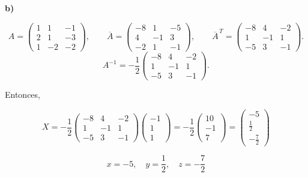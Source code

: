 \documentclass[a4paper,12pt]{article}
\begin{document}
\begin{ejercicio}[title=Ejercicio 25]
\textbf{b)}

\[
A =
\begin{pmatrix}
1 & 1 & -1\\
2 & 1 & -3\\
1 & -2 & -2
\end{pmatrix},
\qquad
\overline{A} =
\begin{pmatrix}
-8 & 1 & -5\\
4 & -1 & 3\\
-2 & 1 & -1
\end{pmatrix},
\qquad
\overline{A}^{\,T} =
\begin{pmatrix}
-8 & 4 & -2\\
1 & -1 & 1\\
-5 & 3 & -1
\end{pmatrix}.
\]
\[
A^{-1}
= -\frac{1}{2}
\begin{pmatrix}
-8 & 4 & -2\\
1 & -1 & 1\\
-5 & 3 & -1
\end{pmatrix}.
\]

Entonces,

\[
X
=
-\frac{1}{2}
\begin{pmatrix}
-8 & 4 & -2\\
1 & -1 & 1\\
-5 & 3 & -1
\end{pmatrix}
\begin{pmatrix}
-1\\ 1\\ 1
\end{pmatrix}
=
-\frac{1}{2}
\begin{pmatrix}
10\\ -1\\ 7
\end{pmatrix} =
\begin{pmatrix}
-5\\[2pt]
\tfrac12\\[2pt]
-\tfrac72
\end{pmatrix}
\]

\[
\boxed{\,x = -5,\quad y = \frac{1}{2},\quad z = -\frac{7}{2}\,}
\]

\end{ejercicio}
\end{document}
